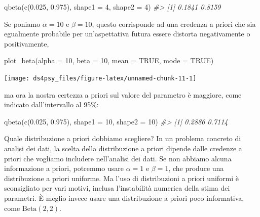 \documentclass[
  11pt,
]{krantz}
\makeatletter
\newenvironment{Shaded}{\begin{snugshade}}{\end{snugshade}}
\newcommand{\AttributeTok}[1]{\textcolor[rgb]{0.61,0.61,0.61}{#1}}
\newcommand{\CommentTok}[1]{\textcolor[rgb]{0.37,0.37,0.37}{\textit{#1}}}
\newcommand{\ConstantTok}[1]{\textcolor[rgb]{0,0,0}{#1}}
\newcommand{\DecValTok}[1]{\textcolor[rgb]{0.06,0.06,0.06}{#1}}
\newcommand{\FloatTok}[1]{\textcolor[rgb]{0.06,0.06,0.06}{#1}}
\newcommand{\FunctionTok}[1]{\textcolor[rgb]{0,0,0}{#1}}
\newcommand{\NormalTok}[1]{#1}
\newenvironment{kframe}{%
\medskip{}
\setlength{\fboxsep}{.8em}
 \def\at@end@of@kframe{}%
 \ifinner\ifhmode%
  \def\at@end@of@kframe{\end{minipage}}%
  \begin{minipage}{\columnwidth}%
 \fi\fi%
 \def\FrameCommand##1{\hskip\@totalleftmargin \hskip-\fboxsep
 \colorbox{shadecolor}{##1}\hskip-\fboxsep
     \hskip-\linewidth \hskip-\@totalleftmargin \hskip\columnwidth}%
 \MakeFramed {\advance\hsize-\width
   \@totalleftmargin\z@ \linewidth\hsize
   \@setminipage}}%
 {\par\unskip\endMakeFramed%
 \at@end@of@kframe}
\renewenvironment{Shaded}{\begin{kframe}}{\end{kframe}}
\theoremstyle{definition}
\theoremstyle{definition}
\theoremstyle{definition}
\theoremstyle{definition}
\theoremstyle{remark}
\makeatother
\begin{document}
\begin{Shaded}
\begin{Highlighting}[]
\FunctionTok{qbeta}\NormalTok{(}\FunctionTok{c}\NormalTok{(}\FloatTok{0.025}\NormalTok{, }\FloatTok{0.975}\NormalTok{), }\AttributeTok{shape1 =} \DecValTok{4}\NormalTok{, }\AttributeTok{shape2 =} \DecValTok{4}\NormalTok{)}
\CommentTok{\#\textgreater{} [1] 0.1841 0.8159}
\end{Highlighting}
\end{Shaded}

Se poniamo \(\alpha=10\) e \(\beta=10\), questo corrisponde ad una credenza a priori che sia egualmente probabile per un'aspettativa futura essere distorta negativamente o positivamente,

\begin{Shaded}
\begin{Highlighting}[]
\FunctionTok{plot\_beta}\NormalTok{(}\AttributeTok{alpha =} \DecValTok{10}\NormalTok{, }\AttributeTok{beta =} \DecValTok{10}\NormalTok{, }\AttributeTok{mean =} \ConstantTok{TRUE}\NormalTok{, }\AttributeTok{mode =} \ConstantTok{TRUE}\NormalTok{)}
\end{Highlighting}
\end{Shaded}

\begin{center}\texttt{[image: ds4psy\_files/figure-latex/unnamed-chunk-11-1]} \end{center}

ma ora la nostra certezza a priori sul valore del parametro è maggiore, come indicato dall'intervallo al 95\%:

\begin{Shaded}
\begin{Highlighting}[]
\FunctionTok{qbeta}\NormalTok{(}\FunctionTok{c}\NormalTok{(}\FloatTok{0.025}\NormalTok{, }\FloatTok{0.975}\NormalTok{), }\AttributeTok{shape1 =} \DecValTok{10}\NormalTok{, }\AttributeTok{shape2 =} \DecValTok{10}\NormalTok{)}
\CommentTok{\#\textgreater{} [1] 0.2886 0.7114}
\end{Highlighting}
\end{Shaded}

Quale distribuzione a priori dobbiamo scegliere? In un problema concreto di analisi dei dati, la scelta della distribuzione a priori dipende dalle credenze a priori che vogliamo includere nell'analisi dei dati. Se non abbiamo alcuna informazione a priori, potremmo usare \(\alpha=1\) e \(\beta=1\), che produce una distribuzione a priori uniforme. Ma l'uso di distribuzioni a priori uniformi è sconsigliato per vari motivi, inclusa l'instabilità numerica della stima dei parametri. È meglio invece usare una distribuzione a priori poco informativa, come \(\mbox{Beta}(2, 2)\).
\end{document}
